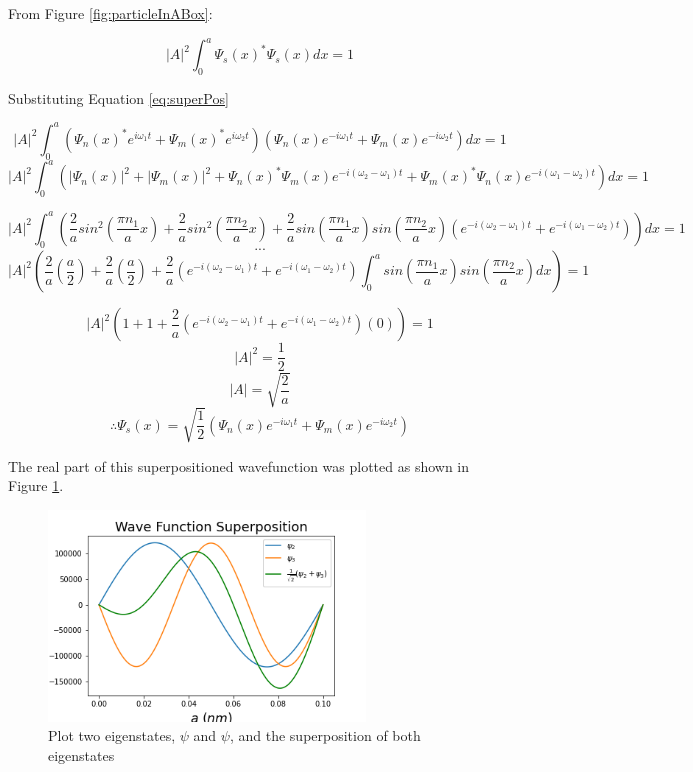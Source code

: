 From Figure \ref{fig:particleInABox}:

$$\left | A \right |^2 \int_{0}^{a} \Psi_s (x)^{*} \Psi_s (x)dx = 1$$

Substituting Equation \ref{eq:superPos}

$$\left | A \right |^2 \int_{0}^{a} (\Psi_n (x)^{*}e^{i \omega_{1} t} + \Psi_m (x)^{*}e^{i \omega_{2} t}) (\Psi_n (x)e^{-i \omega_{1} t} + \Psi_m (x)e^{-i \omega_{2} t})dx = 1$$
$$\left | A \right |^2 \int_{0}^{a} (\left | \Psi_n (x) \right |^2 + \left | \Psi_m (x) \right |^2 + \Psi_n (x)^{*}\Psi_m (x)e^{-i(\omega_{2}- \omega_{1}) t} + \Psi_m (x)^{*}\Psi_n (x)e^{-i(\omega_{1}- \omega_{2}) t})dx = 1$$

$$ \left | A \right |^2 \int_{0}^{a}\left(\frac{2}{a} sin^{2}(\frac{\pi n_1}{a}x)+\frac{2}{a} sin^{2}(\frac{\pi n_2}{a}x)+\frac{2}{a} sin(\frac{\pi n_1}{a}x)sin(\frac{\pi n_2}{a}x)(e^{-i(\omega_{2}- \omega_{1})t}+e^{-i(\omega_{1}- \omega_{2})t})\right)dx = 1$$
$$...$$
$$\left | A \right |^2 \left( \frac{2}{a}\left(\frac{a}{2}\right) + \frac{2}{a}\left(\frac{a}{2}\right) + \frac{2}{a}(e^{-i(\omega_{2}- \omega_{1})t}+e^{-i(\omega_{1}- \omega_{2})t})\int_{0}^{a} sin(\frac{\pi n_1}{a}x)sin(\frac{\pi n_2}{a}x)dx \right)=1$$

$$\left | A \right |^2 \left( 1 + 1 + \frac{2}{a}(e^{-i(\omega_{2}- \omega_{1})t}+e^{-i(\omega_{1}- \omega_{2})t})(0) \right)=1$$
$$\left | A \right |^2 = \frac{1}{2}$$
$$\left | A \right | = \sqrt{\frac{2}{a}}$$
$$\therefore \Psi_s (x) = \sqrt{\frac{1}{2}} \left( \Psi_n (x)e^{-i \omega_{1} t} + \Psi_m (x)e^{-i \omega_{2} t}\right)$$

The real part of this superpositioned wavefunction was plotted as shown in Figure \ref{fig:superPosWave}.

\begin{figure}[h]
    \centering
    \includegraphics[width=0.75\textwidth]{lab1/images/superpositionWave.png}
    \caption{Plot two eigenstates, $\psi$ and $\psi$, and the superposition of both eigenstates}
    \label{fig:superPosWave}
\end{figure}

